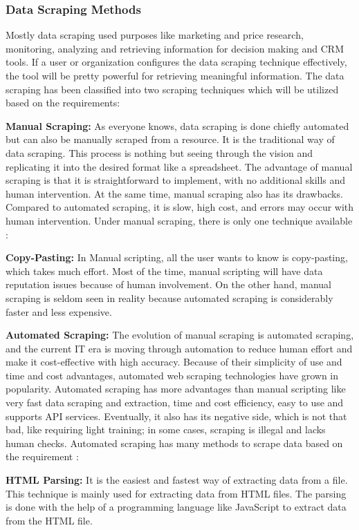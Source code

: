 %
%
\subsubsection{Data Scraping Methods}
Mostly data scraping used purposes like marketing and price research, monitoring, analyzing and retrieving information for decision making and CRM tools. If a user or organization configures the data scraping technique effectively, the tool will be pretty powerful for retrieving meaningful information. The data scraping has been classified into two scraping techniques which will be utilized based on the requirements:

{\bf Manual Scraping:} As everyone knows, data scraping is done chiefly automated but can also be manually scraped from a resource. It is the traditional way of data scraping. This process is nothing but seeing through the vision and replicating it into the desired format like a spreadsheet. The advantage of manual scraping is that it is straightforward to implement, with no additional skills and human intervention. At the same time, manual scraping also has its drawbacks. Compared to automated scraping, it is slow, high cost, and errors may occur with human intervention. Under manual scraping, there is only one technique available \cite{Radware}:

	\textbf{Copy-Pasting:} In Manual scripting, all the user wants to know is copy-pasting, which takes much effort. Most of the time, manual scripting will have data reputation issues because of human involvement. On the other hand, manual scraping is seldom seen in reality because automated scraping is considerably faster and less expensive.


{\bf Automated  Scraping:} The evolution of manual scraping is automated scraping, and the current IT era is moving through automation to reduce human effort and make it cost-effective with high accuracy. Because of their simplicity of use and time and cost advantages, automated web scraping technologies have grown in popularity. Automated scraping has more advantages than manual scripting like very fast data scraping and extraction, time and cost efficiency, easy to use and supports API services. Eventually, it also has its negative side, which is not that bad, like requiring light training; in some cases, scraping is illegal and lacks human checks. Automated scraping has many methods to scrape data based on the requirement \cite{Radware}:

\textbf{HTML Parsing:} It is the easiest and fastest way of extracting data from a file. This technique is mainly used for extracting data from HTML files. The parsing is done with the help of a programming language like JavaScript to extract data from the HTML file. 
	
